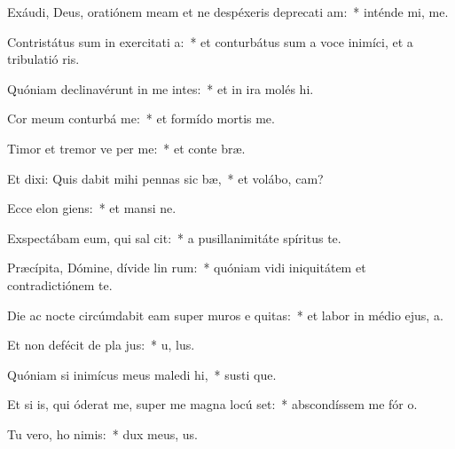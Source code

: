 \item Exáudi, Deus, oratiónem meam et ne despéxeris deprecati am:~* inténde mi,   me.
\item Contristátus sum in exercitati a:~* et conturbátus sum a voce inimíci, et a tribulatió ris.
\item Quóniam declinavérunt in me intes:~* et in ira molés  hi.
\item Cor meum conturbá   me:~* et formído mortis   me.
\item Timor et tremor ve per me:~* et conte  bræ.
\item Et dixi: Quis dabit mihi pennas sic bæ,~* et volábo,  cam?
\item Ecce elon giens:~* et mansi  ne.
\item Exspectábam eum, qui sal  cit:~* a pusillanimitáte spíritus  te.
\item Præcípita, Dómine, dívide lin rum:~* quóniam vidi iniquitátem et contradictiónem  te.
\item Die ac nocte circúmdabit eam super muros e quitas:~* et labor in médio ejus,  a.
\item Et non defécit de pla jus:~* u,  lus.
\item Quóniam si inimícus meus maledi hi,~* susti que.
\item Et si is, qui óderat me, super me magna locú set:~* abscondíssem me fór  o.
\item Tu vero, ho nimis:~* dux meus,   us.
